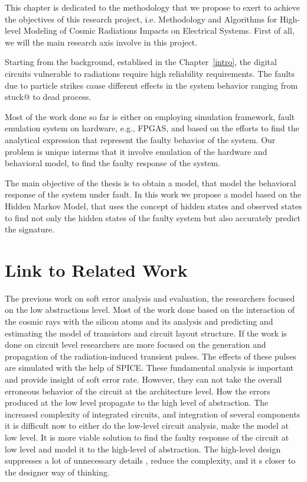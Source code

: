 

This chapter is dedicated to the methodology that we propose to exert to achieve the objectives of this research project, i.e. Methodology and Algorithms for High-level Modeling of Cosmic Radiations Impacts on Electrical Systems. First of all, we will the main research axis involve in this project.


Starting from the background, establised in the Chapter~\ref{intro}, the digital circuits vulnerable to radiations require high reliability  requirements. The faults due to particle strikes cause different effects in the system behavior ranging from stuck@ to dead process.

Most of the work done so far is either on employing simulation framework, fault emulation system on hardware, e.g., FPGAS, and based on the efforts to find the analytical expression that represent the faulty behavior of the system. Our problem is unique interms that it involve emulation of the hardware and behavioral model, to find the faulty response of the system. 


The main objective of the thesis is to obtain a model, that model the behavioral response of the system under fault. In this work we propose a model based on the Hidden Markov Model, that uses the concept of hidden states and observed states to find not only the hidden states of the faulty system but also accurately predict the signature. 


\section{Link to Related Work}

The previous work on soft error analysis and evaluation, the researchers focused on the low abstractions level. Most of the work done based on the interaction of the cosmic rays with the silicon atoms and its analysis and predicting and estimating the model of transistors and circuit layout structure. If the work is done on circuit level researchers are more focused on the generation and propagation of the radiation-induced transient pulses. The effects of these pulses are simulated with the help of SPICE. These fundamental analysis is important and provide insight of soft error rate. However, they can not take the overall erroneous behavior of the circuit at the architecture level. How the errors produced at the low level propagate to the high level of abstraction. The increased complexity of integrated circuits, and integration of several components it is difficult now to either do the low-level circuit analysis, make the model at low level. It is more viable solution to find the faulty response of the circuit at low level and model it to the high-level of abstraction. The high-level design suppresses a lot of unnecessary details , reduce the complexity, and it s closer to the designer way of thinking. 


